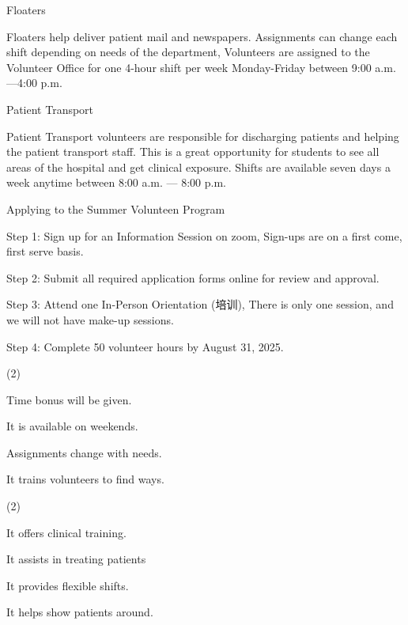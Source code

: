 \documentclass{英语试卷}
\begin{document}
\par Floaters\par
\par Floaters help deliver patient mail and newspapers. Assignments can change each shift depending on needs of the department, Volunteers are assigned to the Volunteer Office for one 4-hour shift per week Monday-Friday between 9:00 a.m. —4:00 p.m.\par
\par Patient Transport\par
\par Patient Transport volunteers are responsible for discharging patients and helping the patient transport staff. This is a great opportunity for students to see all areas of the hospital and get clinical exposure. Shifts are available seven days a week anytime between 8:00 a.m. — 8:00 p.m.\par
\par Applying to the Summer Volunteen Program\par
\par Step 1: Sign up for an Information Session on zoom, Sign-ups are on a first come, first serve basis.\par
\par Step 2: Submit all required application forms online for review and approval.\par
\par Step 3: Attend one In-Person Orientation (培训), There is only one session, and we will not have make-up sessions.\par
\par Step 4: Complete 50 volunteer hours by August 31, 2025.\par
{}
\begin{choices}(2)
  \item Time bonus will be given.
  \item It is available on weekends.
  \item Assignments change with needs.
  \item It trains volunteers to find ways.
\end{choices}
\begin{choices}(2)
  \item It offers clinical training.
  \item It assists in treating patients
  \item It provides flexible shifts.
  \item It helps show patients around.
\end{choices}
\end{document}
